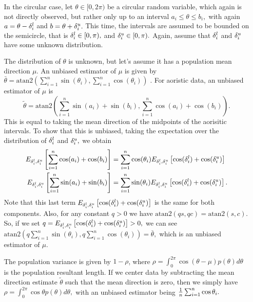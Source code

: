 \newcommand{\hrho}{\hat\rho_{AF}}

In the circular case, let $\theta \in [0, 2\pi)$ be a circular random variable, which again  is not directly observed, but rather only up to an interval $a_i \leq \theta \leq b_i,$ with again $a = \theta - {\delta^l_i}$ and $b = \theta + {\delta^u_i}.$ This time, the intervals are assumed to be bounded on the semicircle, that is ${\delta^l_i} \in [0, \pi),$ and ${\delta^u_i} \in [0, \pi).$ Again, assume that ${\delta^l_i}$ and ${\delta^u_i}$ have some unknown distribution.

The distribution of $\theta$ is unknown, but let's assume it has a population mean direction $\mu$. An unbiased estimator of $\mu$ is given by $\bar\theta = \text{atan2}(\sum_{i=1}^n \sin(\theta_i), \sum_{i=1}^n \cos(\theta_i))$ \citep{mardia2009directional}. For aoristic data, an unbiased estimator of $\mu$ is
\begin{equation}
\tilde\theta = \text{atan2} \left( \sum_{i=1}^n \sin(a_i) + \sin(b_i), \sum_{i=1}^n \cos(a_i) + \cos(b_i) \right).
\end{equation}
This is equal to taking the mean direction of the midpoints of the aorisitic intervals. To show that this is unbiased, taking the expectation over the distribution of ${\delta^l_i}$ and ${\delta^u_i},$ we obtain
\begin{align}
E_{{\delta^l_i}, {\delta^u_i}} \left[\sum_{i=1}^n \cos(a_i) + \cos(b_i)\right] &= \sum_{i=1}^n \cos(\theta_i) E_{{\delta^l_i}, {\delta^u_i}} \left[ \cos({\delta^l_i}) + \cos({\delta^u_i}) \right] \\
E_{{\delta^l_i}, {\delta^u_i}} \left[\sum_{i=1}^n \sin(a_i) + \sin(b_i)\right] &= \sum_{i=1}^n \sin(\theta_i) E_{{\delta^l_i}, {\delta^u_i}} \left[ \cos({\delta^l_i}) + \cos({\delta^u_i}) \right].
\end{align}
Note that this last term $E_{{\delta^l_i}, {\delta^u_i}} \left[ \cos({\delta^l_i}) + \cos({\delta^u_i}) \right]$ is the same for both components. Also, for any constant $q > 0$ we have $\text{atan2}(qs, qc) = \text{atan2}(s, c).$ So, if we set $q = E_{{\delta^l_i}, {\delta^u_i}} \left[ \cos({\delta^l_i}) + \cos({\delta^u_i}) \right] > 0,$ we can see $\text{atan2}(q \sum_{i=1}^n \sin(\theta_i), q \sum_{i=1}^n \cos(\theta_i)) = \bar\theta,$ which is an unbiased estimator of $\mu$.

The population variance is given by $1 - \rho$, where $\rho = \int_0^{2\pi} \cos(\theta - \mu) p(\theta) d\theta$ is the population resultant length. If we center data by subtracting the mean direction estimate  $\tilde\theta$ such that the mean direction is zero, then we simply have $\rho = \int_0^{2\pi} \cos\theta p(\theta) d\theta,$ with an unbiased estimator being $\frac{1}{n}\sum_{i=1}^n \cos\theta_i.$

